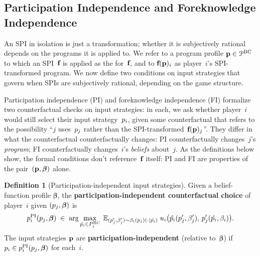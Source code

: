 \documentclass[sigconf]{aamas}
\newcommand{\fullbf}{\boldsymbol{\beta}}
\theoremstyle{definition}
\newtheorem{definition}{Definition} %
\newcommand{\bcprogspacei}{P^{\mathrm{BC}}_i}
\newcommand{\allbcprog}{\mathcal{P}^{\mathrm{BC}}}
\begin{document}
\subsection{Participation Independence and Foreknowledge Independence}\label{sub:pifi}

An SPI in isolation is just a transformation; whether it is subjectively rational depends on the programs it is applied to. We refer to a program profile $\fullprog \in \allbcprog$ to which an SPI~$\textbf{f}$ is applied as the  for~$\textbf{f}$, and to $\textbf{f}(\textbf{p})_i$ as player~$i$'s SPI-transformed program. We now define two conditions on input strategies that govern when SPIs are subjectively rational, depending on the game structure.

Participation independence (PI) and foreknowledge independence (FI) formalize two counterfactual checks on input strategies:
in each, we ask whether player~$i$ would still select their input strategy~$p_i$, given
some counterfactual that refers to the possibility “$j$ uses~$p_j$ rather than the SPI-transformed~$\textbf{f}(\textbf{p})_j$”. They differ in what the counterfactual counterfactually changes: PI counterfactually changes~$j$'s \emph{program}; FI counterfactually changes~$i$'s \emph{beliefs} about~$j$. As the definitions below show, the formal conditions don't reference~$\textbf{f}$ itself: PI and FI are properties of the pair~$(\fullprog, \fullbf)$ alone. 

\begin{definition}[Participation-independent input strategies]
\label{def:pi}
Given a belief-function profile $\fullbf$, the \textbf{participation-independent counterfactual choice} of player~$i$ given $(\progj, \fullbf)$ is
$$
\progi^{\text{PI}}(\progj, \fullbf) \;\in\; \arg\max_{\hat{\progi} \in \bcprogspacei} \; \mathbb{E}_{(\progj', \beta_j') \sim \beta_i(\progj)(\cdot \mid \hat{\progi})} \; \payi\bigl(\hat{\progi}(\progj', \beta_j'),\, \progj'(\hat{\progi}, \beta_i)\bigr).
$$
The input strategies $\textbf{p}$ are \textbf{participation-independent} (relative to~$\fullbf$) if $\progi \in \progi^{\text{PI}}(\progj, \fullbf)$ for each~$i$.
\end{definition}
\end{document}

